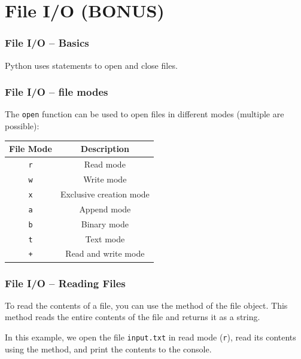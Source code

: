 \documentclass{beamer}
\begin{document}
\section{File I/O (BONUS)}
\begin{frame}
  \frametitle{File I/O -- Basics}
  Python uses  statements to open and close files.\\
  
\end{frame}
\begin{frame}
  \frametitle{File I/O -- file modes}
  The \texttt{open} function can be used to open files in different modes (multiple are possible):\\
  \begin{table}[h]
  \centering
  \begin{tabular}{|c|c|}
  \hline
  \textbf{File Mode} & \textbf{Description} \\ \hline
  \texttt{r} & Read mode \\ \hline
  \texttt{w} & Write mode \\ \hline
  \texttt{x} & Exclusive creation mode \\ \hline
  \texttt{a} & Append mode \\ \hline
  \texttt{b} & Binary mode \\ \hline
  \texttt{t} & Text mode \\ \hline
  \texttt{+} & Read and write mode \\ \hline
  \end{tabular}
  \label{tab:file-modes}
  \end{table}
\end{frame}

\begin{frame} \frametitle{File I/O -- Reading Files} To read the contents of a file, you can use the \texttt{} method of the file object. This method reads the entire contents of the file and returns it as a string.

  
  
  In this example, we open the file \texttt{input.txt} in read mode (\texttt{r}), read its contents using the \texttt{}  method, and print the contents to the console. \end{frame}
  
\end{document}
